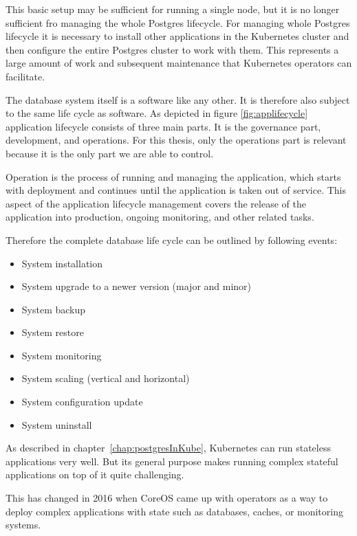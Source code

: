 This basic setup may be sufficient for running a single node, but it is no longer sufficient fro managing the whole Postgres lifecycle. For managing whole Postgres lifecycle it is necessary to install other applications in the Kubernetes cluster and then configure the entire Postgres cluster to work with them. This represents a large amount of work and subsequent maintenance that Kubernetes operators can facilitate.

\label{chap:lifecycle}
The database system itself is a software like any other. It is therefore also subject to the same life cycle as software.
As depicted in figure \ref{fig:applifecycle} application lifecycle consists of three main parts. It is the governance part, development, and operations. For this thesis, only the operations part is relevant because it is the only part we are able to control.

Operation is the process of running and managing the application, which starts with deployment and continues until the application is taken out of service. This aspect of the application lifecycle management covers the release of the application into production, ongoing monitoring, and other related tasks. \cite{ALM}

Therefore the complete database life cycle can be outlined by following events:
\begin{itemize}
    \item System installation
    \item System upgrade to a newer version (major and minor)
    \item System backup
    \item System restore
    \item System monitoring
    \item System scaling (vertical and horizontal)
    \item System configuration update
    \item System uninstall
\end{itemize}

\pagebreak
{}
\label{chap:operators}
As described in chapter~\ref{chap:postgresInKube}, Kubernetes can run stateless applications very well. But its general purpose makes running complex stateful applications on top of it quite challenging.


This has changed in 2016 when CoreOS came up with operators as a way to deploy complex applications with state such as databases, caches, or monitoring systems. \cite{IArchiveCOSoperators}

